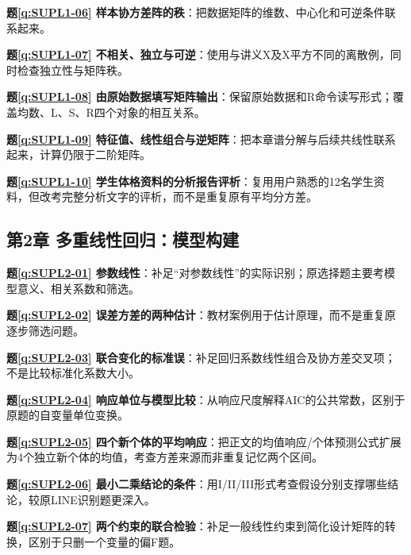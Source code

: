 \noindent\textbf{题\ref*{q:SUPL1-06} 样本协方差阵的秩}：把数据矩阵的维数、中心化和可逆条件联系起来。\par

\noindent\textbf{题\ref*{q:SUPL1-07} 不相关、独立与可逆}：使用与讲义X及X平方不同的离散例，同时检查独立性与矩阵秩。\par

\noindent\textbf{题\ref*{q:SUPL1-08} 由原始数据填写矩阵输出}：保留原始数据和R命令读写形式；覆盖均数、L、S、R四个对象的相互关系。\par

\noindent\textbf{题\ref*{q:SUPL1-09} 特征值、线性组合与逆矩阵}：把本章谱分解与后续共线性联系起来，计算仍限于二阶矩阵。\par

\noindent\textbf{题\ref*{q:SUPL1-10} 学生体格资料的分析报告评析}：复用用户熟悉的12名学生资料，但改考完整分析文字的评析，而不是重复原有平均分方差。\par

\subsection*{第2章 多重线性回归：模型构建}

\noindent\textbf{题\ref*{q:SUPL2-01} 参数线性}：补足“对参数线性”的实际识别；原选择题主要考模型意义、相关系数和筛选。\par

\noindent\textbf{题\ref*{q:SUPL2-02} 误差方差的两种估计}：教材案例用于估计原理，而不是重复原逐步筛选问题。\par

\noindent\textbf{题\ref*{q:SUPL2-03} 联合变化的标准误}：补足回归系数线性组合及协方差交叉项；不是比较标准化系数大小。\par

\noindent\textbf{题\ref*{q:SUPL2-04} 响应单位与模型比较}：从响应尺度解释AIC的公共常数，区别于原题的自变量单位变换。\par

\noindent\textbf{题\ref*{q:SUPL2-05} 四个新个体的平均响应}：把正文的均值响应/个体预测公式扩展为4个独立新个体的均值，考查方差来源而非重复记忆两个区间。\par

\noindent\textbf{题\ref*{q:SUPL2-06} 最小二乘结论的条件}：用I/II/III形式考查假设分别支撑哪些结论，较原LINE识别题更深入。\par

\noindent\textbf{题\ref*{q:SUPL2-07} 两个约束的联合检验}：补足一般线性约束到简化设计矩阵的转换，区别于只删一个变量的偏F题。\par

